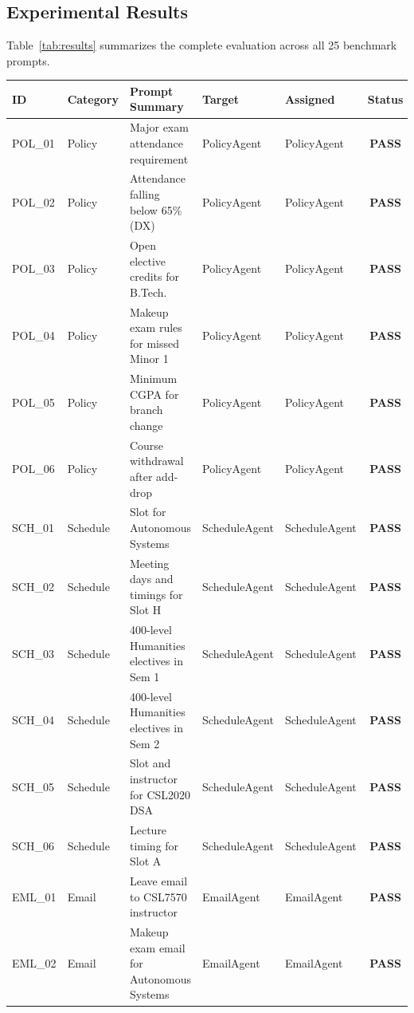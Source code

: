 \documentclass[10pt,a4paper]{article}
\begin{document}
\subsection{Experimental Results}
Table~\ref{tab:results} summarizes the complete evaluation across all 25 benchmark prompts.

\begin{table}[htbp]
\centering\footnotesize
\begin{tabularx}{\textwidth}{llXllc}
\toprule
\textbf{ID} & \textbf{Category} & \textbf{Prompt Summary} & \textbf{Target} & \textbf{Assigned} & \textbf{Status} \\
\midrule
POL\_01 & Policy & Major exam attendance requirement & PolicyAgent & PolicyAgent & \textbf{PASS} \\
POL\_02 & Policy & Attendance falling below 65\% (DX) & PolicyAgent & PolicyAgent & \textbf{PASS} \\
POL\_03 & Policy & Open elective credits for B.Tech. & PolicyAgent & PolicyAgent & \textbf{PASS} \\
POL\_04 & Policy & Makeup exam rules for missed Minor 1 & PolicyAgent & PolicyAgent & \textbf{PASS} \\
POL\_05 & Policy & Minimum CGPA for branch change & PolicyAgent & PolicyAgent & \textbf{PASS} \\
POL\_06 & Policy & Course withdrawal after add-drop & PolicyAgent & PolicyAgent & \textbf{PASS} \\
\midrule
SCH\_01 & Schedule & Slot for Autonomous Systems & ScheduleAgent & ScheduleAgent & \textbf{PASS} \\
SCH\_02 & Schedule & Meeting days and timings for Slot H & ScheduleAgent & ScheduleAgent & \textbf{PASS} \\
SCH\_03 & Schedule & 400-level Humanities electives in Sem 1 & ScheduleAgent & ScheduleAgent & \textbf{PASS} \\
SCH\_04 & Schedule & 400-level Humanities electives in Sem 2 & ScheduleAgent & ScheduleAgent & \textbf{PASS} \\
SCH\_05 & Schedule & Slot and instructor for CSL2020 DSA & ScheduleAgent & ScheduleAgent & \textbf{PASS} \\
SCH\_06 & Schedule & Lecture timing for Slot A & ScheduleAgent & ScheduleAgent & \textbf{PASS} \\
\midrule
EML\_01 & Email & Leave email to CSL7570 instructor & EmailAgent & EmailAgent & \textbf{PASS} \\
EML\_02 & Email & Makeup exam email for Autonomous Systems & EmailAgent & EmailAgent & \textbf{PASS} \\

\end{tabularx}
\end{table}
\end{document}

